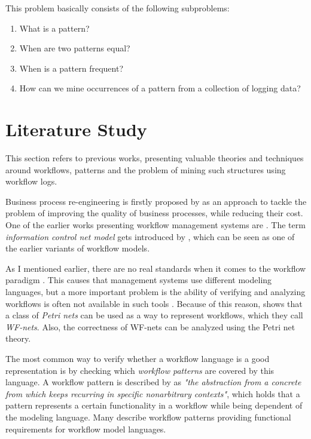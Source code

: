 \documentclass[a4paper,11pt]{article}
\begin{document}
This problem basically consists of the following subproblems:
\begin{enumerate}
\item What is a pattern?
\item When are two patterns equal?
\item When is a pattern frequent?
\item How can we mine occurrences of a pattern from a collection of logging data?
\end{enumerate}

\section{Literature Study}
This section refers to previous works, presenting valuable theories and techniques around workflows, patterns and the problem of mining such structures using workflow logs.

Business process re-engineering is firstly proposed by \cite{Hammer1990} as an approach to tackle the problem of improving the quality of business processes, while reducing their cost. One of the earlier works presenting workflow management systems are \cite{EngelGLT79,Ellis1982}. The term \textit{information control net model} gets introduced by \cite{Ellis1982}, which can be seen as one of the earlier variants of workflow models. 

As I mentioned earlier, there are no real standards when it comes to the workflow paradigm \cite{VanderAalst1997}. This causes that management systems use different modeling languages, but a more important problem is the ability of verifying and analyzing workflows is often not available in such tools \cite{VanderAalst1997}. Because of this reason, \cite{VanderAalst1997} shows that a class of \textit{Petri nets} can be used as a way to represent workflows, which they call \textit{WF-nets}. Also, the correctness of WF-nets can be analyzed using the Petri net theory. 


The most common way to verify whether a workflow language is a good representation is by checking which \textit{workflow patterns} are covered by this language. A workflow pattern is described by \cite{Riehle1996} as \textit{"the abstraction from a concrete from which keeps recurring in specific nonarbitrary contexts"}, which holds that a pattern represents a certain functionality in a workflow while being dependent of the modeling language. Many \cite{VanderAalst2003Patterns,Dijkstra2003ControlPatterns,Russell2004DataPatterns,Russell2005ResourcePatterns,Russell2006ExceptionPatterns} describe workflow patterns providing functional requirements for workflow model languages. 
\end{document}
